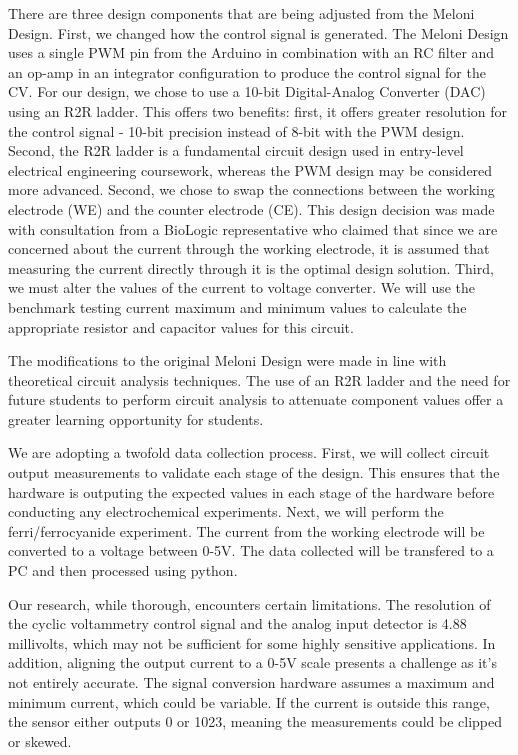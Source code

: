 \documentclass{article}
\begin{document}
There are three design components that are being adjusted from the Meloni Design. First, we changed how the control signal is generated. The Meloni Design uses a single PWM pin from the Arduino in combination with an RC filter and an op-amp in an integrator configuration to produce the control signal for the CV. For our design, we chose to use a 10-bit Digital-Analog Converter (DAC) using an R2R ladder. This offers two benefits: first, it offers greater resolution for the control signal - 10-bit precision instead of 8-bit with the PWM design. Second, the R2R ladder is a fundamental circuit design used in entry-level electrical engineering coursework, whereas the PWM design may be considered more advanced. Second, we chose to swap the connections between the working electrode (WE) and the counter electrode (CE). This design decision was made with consultation from a BioLogic representative who claimed that since we are concerned about the current through the working electrode, it is assumed that measuring the current directly through it is the optimal design solution. Third, we must alter the values of the current to voltage converter. We will use the benchmark testing current maximum and minimum values to calculate the appropriate resistor and capacitor values for this circuit.

The modifications to the original Meloni Design were made in line with theoretical circuit analysis techniques. The use of an R2R ladder and the need for future students to perform circuit analysis to attenuate component values offer a greater learning opportunity for students.

We are adopting a twofold data collection process. First, we will collect circuit output measurements to validate each stage of the design. This ensures that the hardware is outputing the expected values in each stage of the hardware before conducting any electrochemical experiments. Next, we will perform the ferri/ferrocyanide experiment. The current from the working electrode will be converted to a voltage between 0-5V. The data collected will be transfered to a PC and then processed using python.

Our research, while thorough, encounters certain limitations. The resolution of the cyclic voltammetry control signal and the analog input detector is 4.88 millivolts, which may not be sufficient for some highly sensitive applications. In addition, aligning the output current to a 0-5V scale presents a challenge as it's not entirely accurate. The signal conversion hardware assumes a maximum and minimum current, which could be variable. If the current is outside this range, the sensor either outputs 0 or 1023, meaning the measurements could be clipped or skewed.
\end{document}
